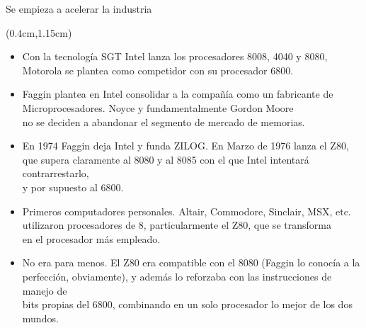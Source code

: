 \documentclass[table,dvipsnames,aspectratio=169]{beamer}
\begin{document}
\begin{frame}{Se empieza a acelerar la industria}
 \begin{textblock*}{\textwidth}(0.4cm,1.15cm)
  \begin{itemize}[<+(1)->]\justifying
   \item Con la tecnología SGT Intel lanza los procesadores 8008, 4040 y 8080,\\
   Motorola se plantea como competidor con su procesador 6800.
   \item Faggin plantea en Intel consolidar a la compañía como un fabricante de\\
   Microprocesadores. \textcolor{furfiBlue}{Noyce y fundamentalmente Gordon Moore\\
   no se deciden a abandonar el segmento de mercado de memorias.}
   \item \textcolor{furfiBlue}{En 1974 Faggin deja Intel y funda ZILOG.} En Marzo de 1976 lanza el Z80,\\
   que supera claramente al 8080 y al 8085 con el que Intel intentará contrarrestarlo,\\
   y por supuesto al 6800.
   \item Primeros computadores personales. Altair, Commodore, Sinclair, MSX, etc.\\
   utilizaron procesadores de \SI{8}{\bit}, \textcolor{furfiBlue}{particularmente el Z80, que se transforma\\
   en el procesador más empleado.}
   \item No era para menos. El Z80 era compatible con el 8080 (Faggin lo conocía a la\\
   perfección, obviamente), y además lo reforzaba con las instrucciones de manejo de\\
   bits propias del 6800, \textcolor{furfiBlue}{combinando en un solo procesador lo mejor de los dos mundos}.
  \end{itemize}
 \end{textblock*}
\end{frame}
\end{document}
